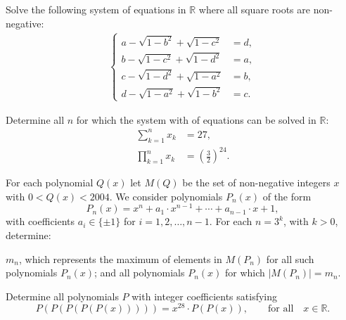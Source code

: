 \documentclass[12pt,a4paper]{memoir}
\theoremstyle{definition}
\begin{document}
\begin{question}[name={2004 Austrian--Polish}]
	Solve the following system of equations in $\mathbb{R}$ where all square roots are non-negative:
	\begin{align*}
		\begin{cases}
			a  - \sqrt{1-b^2} + \sqrt{1-c^2} &= d, \\
			b -  \sqrt{1-c^2} + \sqrt{1-d^2} &= a, \\
			c -  \sqrt{1-d^2} + \sqrt{1-a^2} &= b, \\
			d -  \sqrt{1-a^2} + \sqrt{1-b^2} &= c.
		\end{cases}
	\end{align*}
\end{question}



\begin{question}[name={2004 Austrian--Polish}]
	Determine all $n$ for which the system with of equations can be solved in $\mathbb{R}$: 
	\begin{align*}
		\sum^{n}_{k=1} x_k &= 27,\\
		\prod^{n}_{k=1} x_k &= \left( \frac{3}{2} \right)^{24}.
	\end{align*}
\end{question}



\begin{question}[name={2004 Austrian--Polish}]
	For each polynomial $Q(x)$ let $M(Q)$ be the set of non-negative integers $x$ with $0 < Q(x) < 2004$. We consider polynomials $P_n(x)$ of the form \[P_n(x) = x^n + a_1 \cdot x^{n-1} + \cdots + a_{n-1} \cdot x + 1,\] with coefficients $a_i \in \{ \pm1\}$ for $i = 1, 2, \dots, n-1.$ For each $n = 3^k$, with $k > 0$, determine:
	\begin{tasks}
		\task $m_n$, which represents the maximum of elements in $M(P_n)$ for all such polynomials $P_n(x)$; and
		\task all polynomials $P_n(x)$ for which $|M(P_n)| = m_n$.
	\end{tasks}
\end{question}




\begin{question}[name={2005 Austrian--Polish}]
	Determine all polynomials $P$ with integer coefficients satisfying
	\[P(P(P(P(P(x)))))=x^{28}\cdot P(P(x)),\qquad \text{for all} \quad x\in\mathbb{R}.\]
\end{question}
\end{document}
